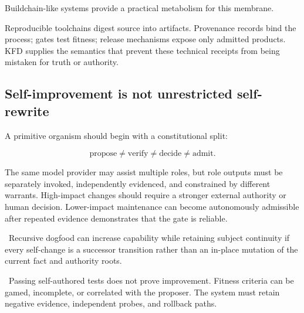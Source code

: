 Buildchain-like systems provide a practical metabolism for this membrane.

Reproducible toolchains digest source into artifacts. Provenance records bind
the process; gates test fitness; release mechanisms expose only admitted
products. KFD supplies the semantics that prevent these technical receipts
from being mistaken for truth or authority.

\subsection{Self-improvement is not unrestricted self-rewrite}

A primitive organism should begin with a constitutional split:

\[
\text{propose} \neq \text{verify} \neq \text{decide} \neq \text{admit}.
\]

The same model provider may assist multiple roles, but role outputs must be
separately invoked, independently evidenced, and constrained by different
warrants. High-impact changes should require a stronger external authority or
human decision. Lower-impact maintenance can become autonomously admissible
after repeated evidence demonstrates that the gate is reliable.

\inferencelabel\ Recursive dogfood can increase capability while retaining
subject continuity if every self-change is a successor transition rather than
an in-place mutation of the current fact and authority roots.

\nonclaimlabel\ Passing self-authored tests does not prove improvement.
Fitness criteria can be gamed, incomplete, or correlated with the proposer.
The system must retain negative evidence, independent probes, and rollback
paths.
